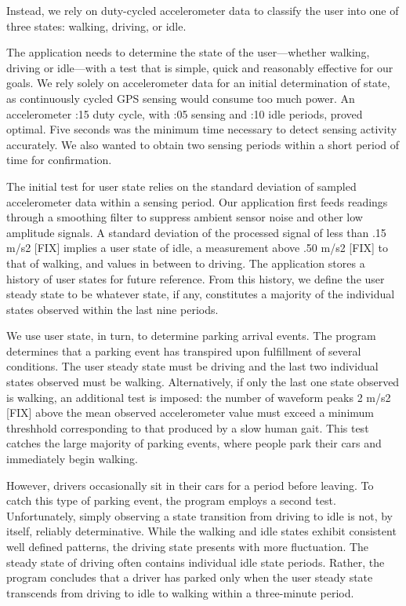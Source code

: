 Instead, we rely on duty-cycled accelerometer data to classify the user into
one of three states: walking, driving, or idle.

The application needs to determine the state of the user---whether walking,
driving or idle---with a test that is simple, quick and reasonably effective
for our goals. We rely solely on accelerometer data for an initial
determination of state, as continuously cycled GPS sensing would consume too
much power. An accelerometer :15 duty cycle, with :05 sensing and :10 idle
periods, proved optimal. Five seconds was the minimum time necessary to
detect sensing activity accurately. We also wanted to obtain two sensing
periods within a short period of time for confirmation.

The initial test for user state relies on the standard deviation of sampled
accelerometer data within a sensing period.  Our application first feeds
readings through a smoothing filter to suppress ambient sensor noise
and other low amplitude signals.  A standard deviation of the processed
signal of less than .15 m/s2 [FIX] implies a user state of idle, a measurement
above .50 m/s2 [FIX] to that of walking, and values in between to driving. The
application stores a history of user states for future reference. From this
history, we define the user steady state to be whatever state, if any,
constitutes a majority of the individual states observed within the last
nine periods.

We use user state, in turn, to determine parking arrival events. The program
determines that a parking event has transpired upon fulfillment of several
conditions.  The user steady state must be driving and the last two
individual states observed must be walking.  Alternatively, if only the last
one state observed is walking, an additional test is imposed:  the number of
waveform peaks 2 m/s2 [FIX] above the mean observed accelerometer value must
exceed a minimum threshhold corresponding to that produced by a slow human
gait.  This test catches the large majority of parking events, where people
park their cars and immediately begin walking.

However, drivers occasionally sit in their cars for a period before leaving.
To catch this type of parking event, the program employs a second test.
Unfortunately, simply observing a state transition from driving to idle is
not, by itself, reliably determinative.  While the walking and idle states
exhibit consistent well defined patterns, the driving state presents with
more fluctuation.  The steady state of driving often contains individual
idle state periods.  Rather, the program concludes that a driver has parked
only when the user steady state transcends from driving to idle to walking
within a three-minute period.

